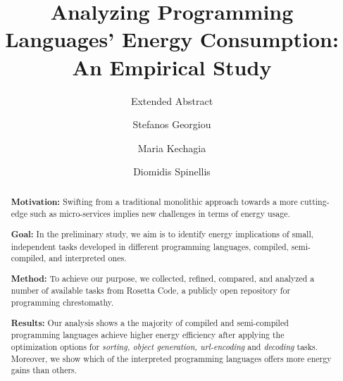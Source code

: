\documentclass[sigconf]{acmart}
\begin{document}
\title{Analyzing Programming Languages' Energy Consumption: An Empirical Study}
\subtitle{Extended Abstract}


\author{Stefanos Georgiou}

\author{Maria Kechagia}

\author{Diomidis Spinellis}


\renewcommand{\shortauthors}{S. Georgiou et al.}


\begin{abstract}
\noindent \textbf{Motivation:} Swifting from a traditional 
monolithic approach towards a more cutting-edge such as micro-services 
implies new challenges in terms of energy usage.

\noindent \textbf{Goal:} In the preliminary study, we aim is to 
identify energy implications of small, independent tasks developed 
in different programming languages, compiled, semi-compiled, and 
interpreted ones.

\noindent \textbf{Method:} To achieve our purpose, we collected, 
refined, compared, and analyzed a number of available tasks from Rosetta 
Code, a publicly open repository for programming chrestomathy. 

\noindent \textbf{Results:} Our analysis shows a the majority of 
compiled and semi-compiled programming languages achieve higher 
energy efficiency after applying the optimization options for 
\textit{sorting, object generation, url-encoding} and 
\textit{decoding} tasks. 
Moreover, we show which of the interpreted programming languages 
offers more energy gains than others.

\end{abstract}
\end{document}
